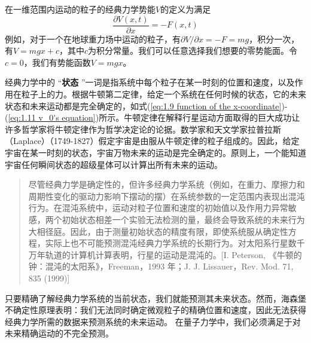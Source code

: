 	在一维范围内运动的粒子的经典力学势能$V$的定义为满足
	\begin{equation}
	 	\boxed{\frac{\partial V \left(x,t\right)}{\partial x} = -F\left(x,t\right)}
	 	\label{eq:1.12 Potential energy in classical mechanics}
	\end{equation}
	例如，对于一个在地球重力场中运动的粒子，有$\partial V / \partial x = -F = mg$，积分一次，有$V = mgx+c$，其中$c$为积分常量。我们可以任意选择我们想要的零势能面。令$c=0$，我们有势能函数$V=mgx$。

	经典力学中的 “\textbf{状态} ”一词是指系统中每个粒子在某一时刻的位置和速度，以及作用在粒子上的力。根据牛顿第二定律，给定一个系统在任何时候的状态，它的未来状态和未来运动都是完全确定的，如式(\ref{eq:1.9 function of the x-coordinate})-(\ref{eq:1.11 v_0's equation})所示。牛顿定律在解释行星运动方面取得的巨大成功让许多哲学家将牛顿定律作为哲学决定论的论据。数学家和天文学家拉普拉斯（Laplace）（1749-1827）假定宇宙是由服从牛顿定律的粒子组成的。因此，给定宇宙在某一时刻的状态，宇宙万物未来的运动是完全确定的。原则上，一个能知道宇宙任何瞬间状态的超级星体可以计算出所有未来的运动。
	\begin{quote}
		\small %
		\noindent %
		尽管经典力学是确定性的，但许多经典力学系统（例如，在重力、摩擦力和周期性变化的驱动力影响下摆动的摆）在系统参数的一定范围内表现出混沌行为。在混沌系统中，运动对粒子位置和速度的初始值以及作用力异常敏感，两个初始状态相差一个实验无法检测的量，最终会导致系统的未来行为大相径庭。因此，由于测量初始状态的精度有限，即使系统服从确定性方程，实际上也不可能预测混沌经典力学系统的长期行为。对太阳系行星数千万年轨道的计算机计算表明，行星的运动是混沌的。[I. Peterson, 《牛顿的钟：混沌的太阳系》，Freeman，1993 年；J. J. Lissauer，Rev. Mod. 71, 835 (1999)]
	\end{quote}
	 
	只要精确了解经典力学系统的当前状态，我们就能预测其未来状态。然而，海森堡不确定性原理表明：我们无法同时确定微观粒子的精确位置和速度，因此无法获得经典力学所需的数据来预测系统的未来运动。 在量子力学中，我们必须满足于对未来精确运动的不完全预测。

